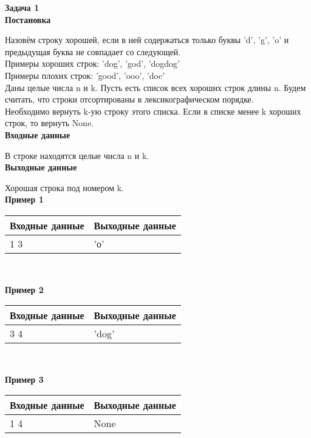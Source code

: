 \documentclass[a4paper]{article}
\begin{document}
 \textbf{Задача 1}\\
 
 \textbf{Постановка}
 
 Назовём строку хорошей, если в ней содержаться только буквы 'd', 'g', 'o' и предыдущая буква не совпадает со следующей.\\
 
 Примеры хороших строк: 'dog', 'god', 'dogdog'\\
 
 Примеры плохих строк: 'good', 'ooo', 'doc'\\
 
 Даны целые числа n и k. Пусть есть список всех хороших строк длины n. Будем считать, что строки отсортированы в лексикографическом порядке. \\
 
 Необходимо вернуть k-ую строку этого списка. Если в списке менее k хороших строк, то вернуть None.\\
 
 \textbf{Входные данные}
 
 В строке находятся целые числа n и k.\\
 
  \textbf{Выходные данные}
  
 Хорошая строка под номером k.\\
 
  \textbf{Пример 1}\\
  \begin{table}[!h]
  \centering
  \begin{tabular}{ | l | l | }
\hline
Входные данные & Выходные данные \\ \hline
1 3 & 'о'  \\
\hline
\end{tabular}\\
\end{table}


\textbf{Пример 2}\\
\begin{table}[!h]
  \centering
  \begin{tabular}{ | l | l | }
\hline
Входные данные & Выходные данные \\ \hline
3 4 & 'dog'  \\
\hline
\end{tabular}\\
\end{table}

\textbf{Пример 3}
\begin{table}[!h]
  \centering
  \begin{tabular}{ | l | l | }
\hline
Входные данные & Выходные данные \\ \hline
1 4 & None  \\
\hline
\end{tabular}
  \end{table}
\end{document}
